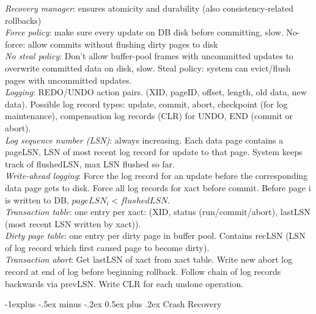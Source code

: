 \documentclass[10pt,landscape]{article}
\makeatletter
\renewcommand{\subsection}{\@startsection{subsection}{2}{0mm}%
                                {-1explus -.5ex minus -.2ex}%
                                {0.5ex plus .2ex}%
                                {\normalfont\normalsize\bfseries}}
\makeatother
\begin{document}
\begin{multicols}{3}
\textit{Recovery manager}: ensures atomicity and durability (also consistency-related rollbacks) \\
\textit{Force policy}: make sure every update on DB disk before committing, slow. No-force: allow commits without flushing dirty pages to disk \\
\textit{No steal policy}: Don't allow buffer-pool frames with uncommitted updates to overwrite committed data on disk, slow. Steal policy: system can evict/flush pages with uncommitted updates. \\
\textit{Logging}: REDO/UNDO action pairs. (XID, pageID, offset, length, old data, new data). Possible log record types: update, commit, abort, checkpoint (for log maintenance), compensation log records (CLR) for UNDO, END (commit or abort). \\
\textit{Log sequence number (LSN)}: always increasing. Each data page contains a pageLSN, LSN of most recent log record for update to that page. System keeps track of flushedLSN, max LSN flushed so far. \\
\textit{Write-ahead logging}: Force the log record for an update before the corresponding data page gets to disk. Force all log records for xact before commit. Before page i is written to DB, $pageLSN_i < flushedLSN$. \\
\textit{Transaction table}: one entry per xact: (XID, status (run/commit/abort), lastLSN (most recent LSN written by xact)). \\
\textit{Dirty page table}: one entry per dirty page in buffer pool. Contains recLSN (LSN of log record which first caused page to become dirty). \\
\textit{Transaction abort}: Get lastLSN of xact from xact table. Write new abort log record at end of log before beginning rollback. Follow chain of log records backwards via prevLSN. Write CLR for each undone operation.

\subsection{Crash Recovery}


\end{multicols}
\end{document}
